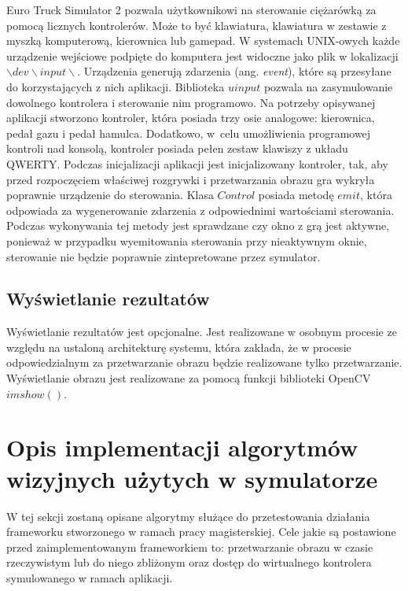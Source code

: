 Euro Truck Simulator 2 pozwala użytkownikowi na sterowanie ciężarówką za pomocą licznych kontrolerów. 
Może to być klawiatura, klawiatura w zestawie z myszką komputerową, kierownica lub gamepad. 
W systemach UNIX-owych każde urządzenie wejściowe podpięte do komputera jest widoczne jako plik w lokalizacji $\backslash dev\backslash input\backslash $. 
Urządzenia generują zdarzenia (ang. \textit{event}), które są przesyłane do korzystających z nich aplikacji.
Biblioteka $uinput$ pozwala na zasymulowanie dowolnego kontrolera i sterowanie nim programowo. 
Na potrzeby opisywanej aplikacji stworzono kontroler, która posiada trzy osie analogowe: kierownica, pedał gazu i pedał hamulca. 
Dodatkowo, w~celu umożliwienia programowej kontroli nad konsolą, kontroler posiada pełen zestaw klawiszy z układu QWERTY. %
Podczas inicjalizacji aplikacji jest inicjalizowany kontroler, tak, aby przed rozpoczęciem właściwej rozgrywki i przetwarzania obrazu gra wykryła poprawnie urządzenie do sterowania. %
Klasa $Control$ posiada metodę $emit$, która odpowiada za wygenerowanie zdarzenia z odpowiednimi wartościami sterowania. 
Podczas wykonywania tej metody jest sprawdzane czy okno z grą jest aktywne, ponieważ w przypadku wyemitowania sterowania przy nieaktywnym oknie, sterowanie nie będzie poprawnie zintepretowane przez symulator. %

\subsection{Wyświetlanie rezultatów}

Wyświetlanie rezultatów jest opcjonalne. 
Jest realizowane w osobnym procesie ze względu na ustaloną architekturę systemu, która zakłada, że w procesie odpowiedzialnym za przetwarzanie obrazu będzie realizowane tylko przetwarzanie. %
Wyświetlanie obrazu jest realizowane za pomocą funkcji biblioteki OpenCV $imshow()$.


\section{Opis implementacji algorytmów wizyjnych użytych w symulatorze}

W tej sekcji zostaną opisane algorytmy służące do przetestowania działania frameworku stworzonego w ramach pracy magisterskiej. %
Cele jakie są postawione przed zaimplementowanym frameworkiem to: przetwarzanie obrazu w czasie rzeczywistym lub do niego zbliżonym oraz dostęp do wirtualnego kontrolera symulowanego w ramach aplikacji. %

